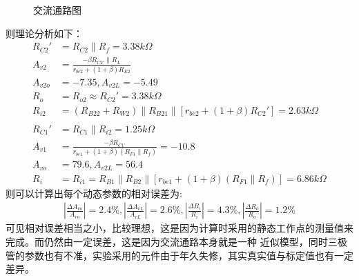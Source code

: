 \documentclass[a4paper,11pt,UTF8]{ctexart}
\begin{document}
    \begin{figure}[htbp]
      \centering
      \caption{交流通路图}
      \label{fig:ACModel}
      \end{figure}
    则理论分析如下：
    \begin{equation}
      \begin{aligned}
        R_{C2}'&=R_{C2}\parallel R_f=3.38k\Omega\\
        A_{v2}&=\frac{-\beta R_{C2'}\parallel R_L}{r_{be2}+(1+\beta)R_{E2}}\\
        A_{v2o}&=-7.35,A_{v2L}=-5.49\\
        R_o&=R_{o2}\approx R_{C2}'=3.38k\Omega\\
        R_{i2}&=(R_{B22}+R_{W2})\parallel R_{B21}\parallel [r_{be2}+(1+\beta)R_{C2}']= 2.63k\Omega\\
        &\,\\
        R_{C1}'&=R_{C1}\parallel R_{i2}=1.25k\Omega\\
        A_{v1}&=\frac{-\beta R_{C1'}}{r_{be1}+(1+\beta)(R_{F1}\parallel R_{f})}=-10.8\\
        A_{vo}&=79.6,A_{v2L}=56.4\\
        R_{i}&=R_{i1}=R_{B1}\parallel R_{B2}\parallel[r_{be1}+(1+\beta)(R_{F1}\parallel R_{f})]=6.86k\Omega
      \end{aligned}
    \end{equation}
    则可以计算出每个动态参数的相对误差为:
    \begin{equation}
      \begin{aligned}
        \left |\frac{\Delta A_{vo}}{A_{vo}}\right |=2.4\%,
        \left |\frac{\Delta A_{vL}}{A_{vL}}\right |=2.6\%,
        \left |\frac{\Delta R_{i}}{R_{i}}\right |=4.3\%,
        \left |\frac{\Delta R_{o}}{R_{o}}\right |=1.2\%
      \end{aligned}
    \end{equation}
    可见相对误差相当之小，比较理想，这是因为计算时采用的静态工作点的测量值来完成。而仍然由一定误差，这是因为交流通路本身就是一种
    近似模型，同时三极管的参数也有不准，实验采用的元件由于年久失修，其实真实值与标定值也有一定差异。
\end{document}

